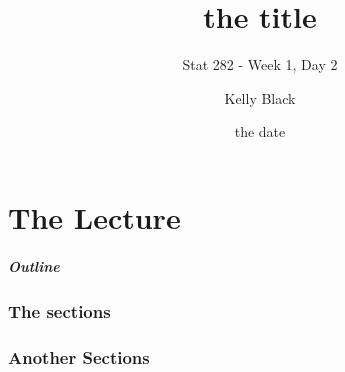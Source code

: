 
\part{The Lecture}

\title{the title}
\subtitle{Stat 282 - Week 1, Day 2}

\author{Kelly Black}
\date{the date}

\begin{frame}
  \titlepage
\end{frame}

\begin{frame}
  \frametitle{Outline}
  \tableofcontents[pausesection,hideallsubsections,part=1]
\end{frame}


\section{The sections}


\begin{frame}
  \frametitle{}


\end{frame}




\section{Another Sections}

\begin{frame}
  \frametitle{}



\end{frame}


\begin{frame}
  \frametitle{}

  \begin{definition}
    
  \end{definition}

\end{frame}


